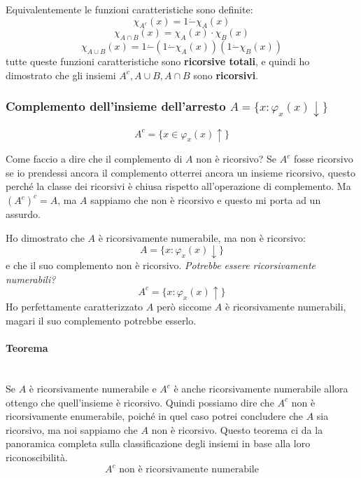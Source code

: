 \documentclass{article}
\begin{document}
Equivalentemente le funzioni caratteristiche sono definite:
$$\chi_{A^c}(x)=1\dot{-}\chi_A(x)$$
$$\chi_{A\cap B}(x)=\chi_A(x)\cdot\chi_B(x)$$
$$\chi_{A\cup B}(x)=1\dot{-}(1\dot{-}\chi_A(x))(1\dot{-}\chi_B(x))$$
tutte queste funzioni caratteristiche sono \textbf{ricorsive totali},
e quindi ho dimostrato che gli insiemi $A^c,A\cup B, A\cap B$ sono \textbf{ricorsivi}.

\subsubsection{Complemento dell'insieme dell'arresto $A=\{x:\varphi_x(x)\downarrow\}$}
$$A^c=\{x\in\varphi_x(x)\uparrow\}$$

Come faccio a dire che il complemento di $A$ non è ricorsivo? Se $A^c$ fosse
ricorsivo se io prendessi ancora il complemento otterrei ancora un insieme ricorsivo,
questo perché la classe dei ricorsivi è chiusa rispetto all'operazione di complemento.
Ma $(A^c)^c=A$, ma $A$ sappiamo che non è ricorsivo e questo mi porta ad un assurdo.

Ho dimostrato che $A$ è ricorsivamente numerabile, ma non è ricorsivo:
$$A=\{x:\varphi_x(x)\downarrow\}$$
e che il suo complemento non è ricorsivo. \textit{Potrebbe essere ricorsivamente
    numerabili?}
$$A^c=\{x:\varphi_x(x)\uparrow\}$$
Ho perfettamente caratterizzato $A$ però siccome $A$ è ricorsivamente numerabili,
magari il suo complemento potrebbe esserlo.

\paragraph{Teorema}\mbox{}\\
Se $A$ è ricorsivamente numerabile e $A^c$ è anche ricorsivamente numerabile allora ottengo
che quell'insieme è ricorsivo. Quindi possiamo dire che $A^c$ non è ricorsivamente
enumerabile, poiché in quel caso potrei concludere che $A$ sia ricorsivo, ma noi sappiamo
che $A$ non è ricorsivo.
Questo teorema ci da la panoramica completa sulla classificazione degli insiemi in base alla
loro riconoscibilità.
$$A^c\text{ non è ricorsivamente numerabile}$$
\end{document}
